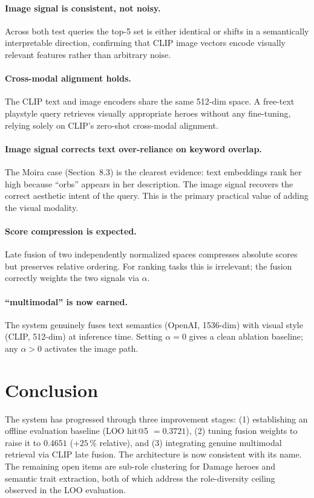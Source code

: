 \documentclass[11pt, a4paper]{article}
\begin{document}
\paragraph{Image signal is consistent, not noisy.}
Across both test queries the top-5 set is either identical or shifts in a
semantically interpretable direction, confirming that CLIP image vectors
encode visually relevant features rather than arbitrary noise.

\paragraph{Cross-modal alignment holds.}
The CLIP text and image encoders share the same 512-dim space.  A free-text
playstyle query retrieves visually appropriate heroes without any fine-tuning,
relying solely on CLIP's zero-shot cross-modal alignment.

\paragraph{Image signal corrects text over-reliance on keyword overlap.}
The Moira case (Section~8.3) is the clearest evidence: text embeddings rank
her high because ``orbs'' appears in her description.  The image signal
recovers the correct aesthetic intent of the query.  This is the primary
practical value of adding the visual modality.

\paragraph{Score compression is expected.}
Late fusion of two independently normalized spaces compresses absolute
scores but preserves relative ordering.  For ranking tasks this is
irrelevant; the fusion correctly weights the two signals via $\alpha$.

\paragraph{``multimodal'' is now earned.}
The system genuinely fuses text semantics (OpenAI, 1536-dim) with visual
style (CLIP, 512-dim) at inference time.  Setting $\alpha=0$ gives a
clean ablation baseline; any $\alpha > 0$ activates the image path.

\section{Conclusion}

The system has progressed through three improvement stages: (1) establishing
an offline evaluation baseline (LOO hit@5 $= 0.3721$), (2) tuning fusion
weights to raise it to $0.4651$ ($+25\,\%$ relative), and (3) integrating
genuine multimodal retrieval via CLIP late fusion.  The architecture is now
consistent with its name.  The remaining open items are sub-role clustering
for Damage heroes and semantic trait extraction, both of which address the
role-diversity ceiling observed in the LOO evaluation.
\end{document}
